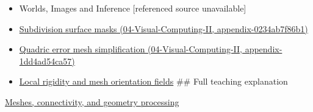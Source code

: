 \begin{itemize}
\item
  {Worlds, Images and Inference {[}referenced source unavailable{]}}
\item
  \href{../04-Visual-Computing-II/main.pdf\#nameddest=appendix-0234ab7f86b1}{Subdivision surface masks (04-Visual-Computing-II, appendix-0234ab7f86b1)}
\item
  \href{../04-Visual-Computing-II/main.pdf\#nameddest=appendix-1dd4ad54ca57}{Quadric error mesh simplification (04-Visual-Computing-II, appendix-1dd4ad54ca57)}
\item
  \hyperref[appendix-7107009c505b]{Local rigidity and mesh orientation fields} \#\# Full teaching explanation
\end{itemize}

\hyperref[03-visual-computing-i-ch002-meshes-connectivity-and-geometry-processing]{Meshes, connectivity, and geometry processing}
